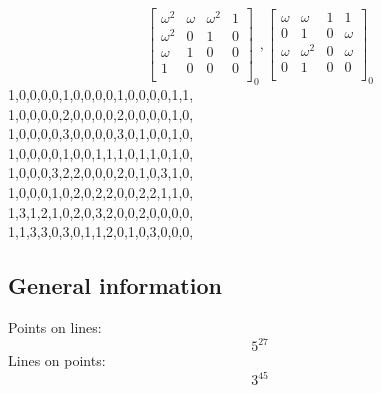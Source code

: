 $$
\left[
\begin{array}{*{4}{r}}
\omega^{2} & \omega  & \omega^{2} & 1\\
\omega^{2} & 0 & 1 & 0\\
\omega  & 1 & 0 & 0\\
1 & 0 & 0 & 0\\
\end{array}
\right]
_{0}
, 
\left[
\begin{array}{*{4}{r}}
\omega  & \omega  & 1 & 1\\
0 & 1 & 0 & \omega \\
\omega  & \omega^{2} & 0 & \omega \\
0 & 1 & 0 & 0\\
\end{array}
\right]
_{0}
$$
1,0,0,0,0,1,0,0,0,0,1,0,0,0,0,1,1,\\
1,0,0,0,0,2,0,0,0,0,2,0,0,0,0,1,0,\\
1,0,0,0,0,3,0,0,0,0,3,0,1,0,0,1,0,\\
1,0,0,0,0,1,0,0,1,1,1,0,1,1,0,1,0,\\
1,0,0,0,3,2,2,0,0,0,2,0,1,0,3,1,0,\\
1,0,0,0,1,0,2,0,2,2,0,0,2,2,1,1,0,\\
1,3,1,2,1,0,2,0,3,2,0,0,2,0,0,0,0,\\
1,1,3,3,0,3,0,1,1,2,0,1,0,3,0,0,0,\\
\subsection*{General information}
Points on lines:
$$
5^{27}$$
Lines on points:
$$
3^{45}$$
